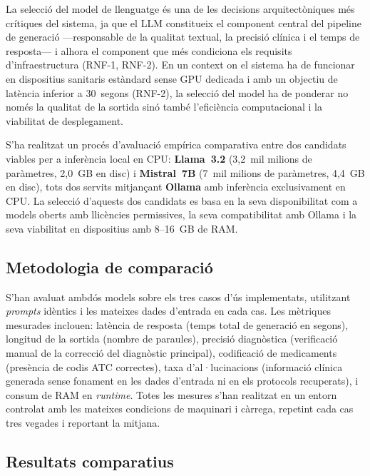 \documentclass[CAT]{TFUOC}%
\begin{document}
La selecció del model de llenguatge és una de les decisions arquitectòniques més crítiques del sistema, ja que el LLM constitueix el component central del pipeline de generació ---responsable de la qualitat textual, la precisió clínica i el temps de resposta--- i alhora el component que més condiciona els requisits d'infraestructura (RNF-1, RNF-2). En un context on el sistema ha de funcionar en dispositius sanitaris estàndard sense GPU dedicada i amb un objectiu de latència inferior a 30~segons (RNF-2), la selecció del model ha de ponderar no només la qualitat de la sortida sinó també l'eficiència computacional i la viabilitat de desplegament.

S'ha realitzat un procés d'avaluació empírica comparativa entre dos candidats viables per a inferència local en CPU: \textbf{Llama~3.2} (3,2~mil milions de paràmetres, 2,0~GB en disc) i \textbf{Mistral~7B} (7~mil milions de paràmetres, 4,4~GB en disc), tots dos servits mitjançant \textbf{Ollama} amb inferència exclusivament en CPU. La selecció d'aquests dos candidats es basa en la seva disponibilitat com a models oberts amb llicències permissives, la seva compatibilitat amb Ollama i la seva viabilitat en dispositius amb 8--16~GB de RAM.

\subsection{Metodologia de comparació}

S'han avaluat ambdós models sobre els tres casos d'ús implementats, utilitzant \textit{prompts} idèntics i les mateixes dades d'entrada en cada cas. Les mètriques mesurades inclouen: latència de resposta (temps total de generació en segons), longitud de la sortida (nombre de paraules), precisió diagnòstica (verificació manual de la correcció del diagnòstic principal), codificació de medicaments (presència de codis ATC correctes), taxa d'al·lucinacions (informació clínica generada sense fonament en les dades d'entrada ni en els protocols recuperats), i consum de RAM en \textit{runtime}. Totes les mesures s'han realitzat en un entorn controlat amb les mateixes condicions de maquinari i càrrega, repetint cada cas tres vegades i reportant la mitjana.

\subsection{Resultats comparatius}
\end{document}
